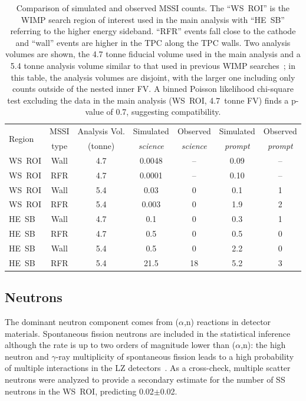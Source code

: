 \begin{table}[htbp]
  \centering
  \caption{Comparison of simulated and observed MSSI counts. The ``WS~ROI'' is the WIMP search region of interest used in the main analysis with ``HE~SB'' referring to the higher energy sideband. ``RFR'' events fall close to the cathode and ``wall'' events are higher in the TPC along the TPC walls. Two analysis volumes are shown, the 4.7 tonne fiducial volume used in the main analysis and a 5.4 tonne analysis volume similar to that used in previous WIMP searches~\cite{LZ:SR3_WS2024}; in this table, the analysis volumes are disjoint, with the larger one including only counts outside of the nested inner FV. A binned Poisson likelihood chi-square test excluding the data in the main analysis (WS~ROI, 4.7~tonne FV) finds a p-value of 0.7, suggesting compatibility. }
  \setlength{\tabcolsep}{6pt} %
  \begin{tabular}{lcccccc}
    \hline\hline
    \multirow{2}{*}{Region} & MSSI &  Analysis Vol. & {Simulated}    & Observed   & Simulated  &Observed   \\ 
     & type & (tonne) & \emph{science} &\emph{science} & \emph{prompt} & \emph{prompt} \\   \hline 
    WS~ROI &Wall & 4.7 & 0.0048   & --  & 0.09 & -- \\
    WS~ROI &RFR & 4.7  & 0.0001  & --  & 0.10 & -- \\ \hline
    WS~ROI &Wall & 5.4 & 0.03   & 0  & 0.1 & 1 \\
    WS~ROI &RFR & 5.4  & 0.003  & 0  & 1.9 & 2 \\
     HE~SB &Wall & 4.7   & 0.1   & 0  & 0.3 & 1 \\
    HE~SB &RFR & 4.7    & 0.5   & 0  & 0.5 & 0 \\
    HE~SB &Wall & 5.4   & 0.5   & 0  & 2.2 & 0 \\
    HE~SB &RFR & 5.4    & 21.5  & 18 & 5.2 & 3 \\   \hline\hline
  \end{tabular}
  \label{tab:MSSI_comp}
\end{table}

\clearpage

\subsection{Neutrons}


The dominant neutron component comes from ($\alpha$,n) reactions in detector materials. 
Spontaneous fission neutrons are included in the statistical inference although the rate is up to two orders of magnitude lower than ($\alpha$,n): the high neutron and $\gamma$-ray multiplicity of spontaneous fission leads to a high probability of multiple interactions in the LZ detectors~\cite{LZ:simulations_2021}. 
As a cross-check, multiple scatter neutrons were analyzed to provide a secondary estimate for the number of SS neutrons in the WS~ROI, predicting 0.02$\pm$0.02. 



